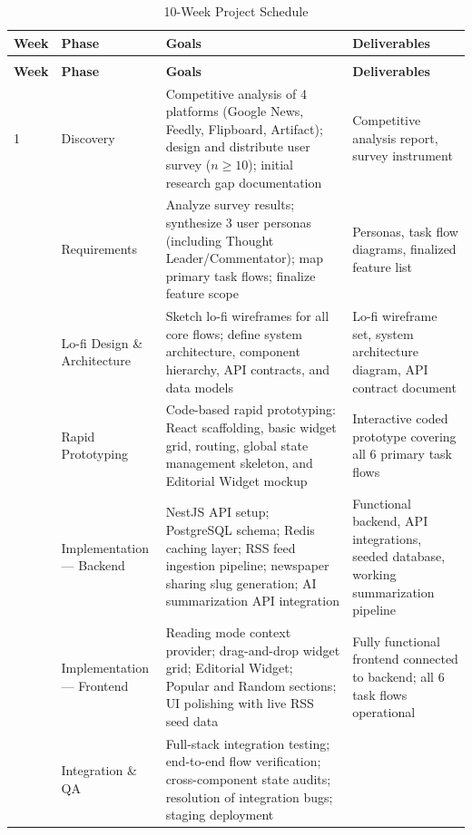 \documentclass[14pt]{article}
\begin{document}
{\small
\renewcommand{\arraystretch}{1.2}
\begin{longtable}{@{}>{\centering\arraybackslash}p{} p{} p{} p{}@{}}
\caption{10-Week Project Schedule}\\
\toprule
\textbf{Week} & \textbf{Phase} & \textbf{Goals} & \textbf{Deliverables} \\
\midrule
\endfirsthead

\multicolumn{4}{l}{\textit{Table 5 continued}} \\
\toprule
\textbf{Week} & \textbf{Phase} & \textbf{Goals} & \textbf{Deliverables} \\
\midrule
\endhead

\bottomrule
\endfoot

1
  & Discovery
  & Competitive analysis of 4 platforms (Google News, Feedly, Flipboard, Artifact); design and distribute user survey ($n \geq 10$); initial research gap documentation
  & Competitive analysis report, survey instrument \\
2
  & Requirements
  & Analyze survey results; synthesize 3 user personas (including Thought Leader/Commentator); map primary task flows; finalize feature scope
  & Personas, task flow diagrams, finalized feature list \\
3
  & Lo-fi Design \& Architecture
  & Sketch lo-fi wireframes for all core flows; define system architecture, component hierarchy, API contracts, and data models
  & Lo-fi wireframe set, system architecture diagram, API contract document \\
4
  & Rapid Prototyping
  & Code-based rapid prototyping: React scaffolding, basic widget grid, routing, global state management skeleton, and Editorial Widget mockup
  & Interactive coded prototype covering all 6 primary task flows \\
5
  & Implementation --- Backend
  & NestJS API setup; PostgreSQL schema; Redis caching layer; RSS feed ingestion pipeline; newspaper sharing slug generation; AI summarization API integration
  & Functional backend, API integrations, seeded database, working summarization pipeline \\
6
  & Implementation --- Frontend
  & Reading mode context provider; drag-and-drop widget grid; Editorial Widget; Popular and Random sections; UI polishing with live RSS seed data
  & Fully functional frontend connected to backend; all 6 task flows operational \\
7
  & Integration \& QA
  & Full-stack integration testing; end-to-end flow verification; cross-component state audits; resolution of integration bugs; staging deployment

\end{longtable}}
\end{document}
